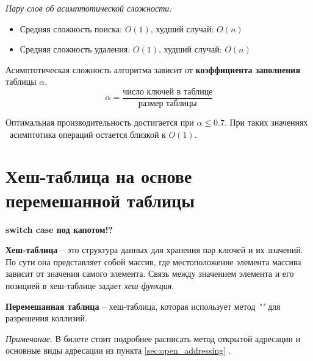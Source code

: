 \vspace{10pt}

\textit{Пару слов об асимптотической сложности:}\par
\begin{itemize}[label=$\triangleright$, font=\scriptsize, noitemsep, topsep=0pt, , partopsep=0pt]
	\item {\footnotesize Средняя сложность поиска: $O(1)$, худший случай: $O(n)$}
	\item {\footnotesize Средняя сложность удаления: $O(1)$, худший случай: $O(n)$}
\end{itemize}
\par
\vspace{5pt}
Асимптотическая сложность алгоритма зависит от \textbf{коэффициента заполнения} таблицы { \(\alpha\)}.
\[
\alpha = \frac{\text{число ключей в таблице}}{\text{размер таблицы}}
\]\par
Оптимальная производительность достигается при $\alpha \leq 0.7$. При таких значениях \alpha \ асимптотика операций остается близкой к $O(1)$.
\vspace{50pt}



\section{Хеш-таблица на основе перемешанной таблицы}
\vspace{-20pt} {\tiny \textbf{\qquad \qquad switch case под капотом!?}}

\textbf{Хеш-таблица} -- это структура данных для хранения пар ключей и их значений. По сути она представляет собой массив, где местоположение элемента массива зависит от значения самого элемента. Связь между значением элемента и его позицией в хеш-таблице задает \textit{хеш-функция}.

\textbf{Перемешанная таблица} -- хеш-таблица, которая использует метод \textit{""} для разрешения коллизий.\par
\vspace{5pt}
{\footnotesize \textit{Примечание}. В билете стоит подробнее расписать метод открытой адресации и основные виды адресации из пункта \ref{sec:open_addressing} .}
\vspace{5pt}

